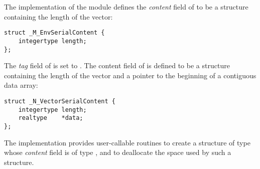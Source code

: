 %
The {\nvecs} implementation of the {\nvector} module
defines the {\em content} field of  to be a structure 
containing the length of the vector:
\begin{verbatim}
struct _M_EnvSerialContent {
    integertype length;
};
\end{verbatim}
The {\em tag} field of  is set to .
The content field of  is defined to be a structure containing
the length of the vector and a pointer to the beginning of a contiguous data array:
\begin{verbatim} 
struct _N_VectorSerialContent {
    integertype length;
    realtype    *data;
};
\end{verbatim}

The {\nvecs} implementation provides user-callable routines  
to create a structure of type  whose {\em content} field is 
of type , and  
to deallocate the space used by such a structure. 

